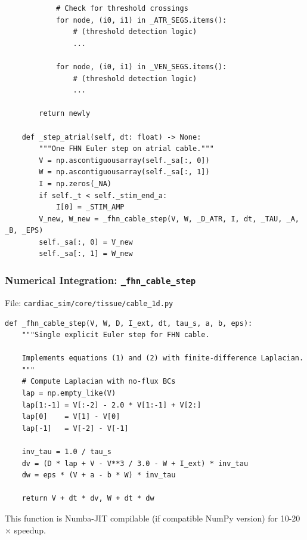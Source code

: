 \documentclass[12pt,a4paper,oneside]{book}
\begin{document}
\begin{lstlisting}
            # Check for threshold crossings
            for node, (i0, i1) in _ATR_SEGS.items():
                # (threshold detection logic)
                ...
            
            for node, (i0, i1) in _VEN_SEGS.items():
                # (threshold detection logic)
                ...
        
        return newly
    
    def _step_atrial(self, dt: float) -> None:
        """One FHN Euler step on atrial cable."""
        V = np.ascontiguousarray(self._sa[:, 0])
        W = np.ascontiguousarray(self._sa[:, 1])
        I = np.zeros(_NA)
        if self._t < self._stim_end_a:
            I[0] = _STIM_AMP
        V_new, W_new = _fhn_cable_step(V, W, _D_ATR, I, dt, _TAU, _A, _B, _EPS)
        self._sa[:, 0] = V_new
        self._sa[:, 1] = W_new
\end{lstlisting}

\subsubsection{Numerical Integration: \texttt{\_fhn\_cable\_step}}

File: \texttt{cardiac\_sim/core/tissue/cable\_1d.py}

\begin{lstlisting}
def _fhn_cable_step(V, W, D, I_ext, dt, tau_s, a, b, eps):
    """Single explicit Euler step for FHN cable.
    
    Implements equations (1) and (2) with finite-difference Laplacian.
    """
    # Compute Laplacian with no-flux BCs
    lap = np.empty_like(V)
    lap[1:-1] = V[:-2] - 2.0 * V[1:-1] + V[2:]
    lap[0]    = V[1] - V[0]
    lap[-1]   = V[-2] - V[-1]
    
    inv_tau = 1.0 / tau_s
    dv = (D * lap + V - V**3 / 3.0 - W + I_ext) * inv_tau
    dw = eps * (V + a - b * W) * inv_tau
    
    return V + dt * dv, W + dt * dw
\end{lstlisting}

This function is Numba-JIT compilable (if compatible NumPy version) for 10-20$\times$ speedup.
\end{document}
